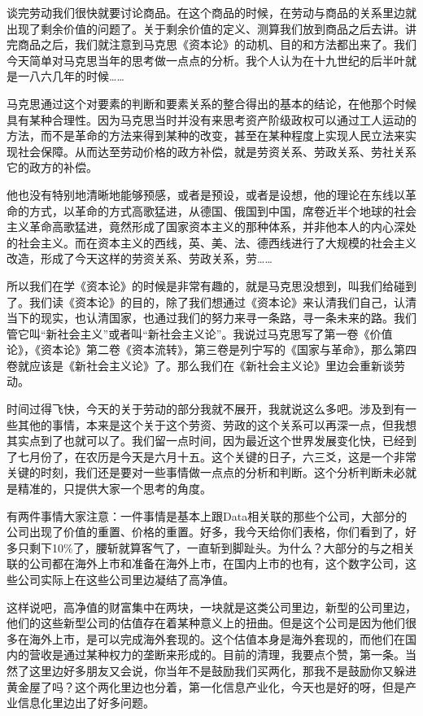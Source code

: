 \documentclass[UTF8, 12pt, a4paper]{ctexrep}
\begin{document}
谈完劳动我们很快就要讨论商品。在这个商品的时候，在劳动与商品的关系里边就出现了剩余价值的问题了。关于剩余价值的定义、测算我们放到商品之后去讲。讲完商品之后，我们就注意到马克思《资本论》的动机、目的和方法都出来了。我们今天简单对马克思当年的思考做一点点的分析。我个人认为在十九世纪的后半叶就是一八六几年的时候……

马克思通过这个对要素的判断和要素关系的整合得出的基本的结论，在他那个时候具有某种合理性。因为马克思当时并没有来思考资产阶级政权可以通过工人运动的方法，而不是革命的方法来得到某种的改变，甚至在某种程度上实现人民立法来实现社会保障。从而达至劳动价格的政方补偿，就是劳资关系、劳政关系、劳社关系它的政方的补偿。

他也没有特别地清晰地能够预感，或者是预设，或者是设想，他的理论在东线以革命的方式，以革命的方式高歌猛进，从德国、俄国到中国，席卷近半个地球的社会主义革命高歌猛进，竟然形成了国家资本主义的那种体系，并非他本人的内心深处的社会主义。而在资本主义的西线，英、美、法、德西线进行了大规模的社会主义改造，形成了今天这样的劳资关系、劳政关系，劳……

所以我们在学《资本论》的时候是非常有趣的，就是马克思没想到，叫我们给碰到了。我们读《资本论》的目的，除了我们想通过《资本论》来认清我们自己，认清当下的现实，也认清国家，也通过我们的努力来寻一条路，寻一条未来的路。我们管它叫“新社会主义”或者叫“新社会主义论”。我说过马克思写了第一卷《价值论》，《资本论》第二卷《资本流转》，第三卷是列宁写的《国家与革命》，那么第四卷就应该是《新社会主义论》了。那么我们在《新社会主义论》里边会重新谈劳动。

时间过得飞快，今天的关于劳动的部分我就不展开，我就说这么多吧。涉及到有一些其他的事情，本来是这个关于这个劳资、劳政的这个关系可以再深一点，但我想其实点到了也就可以了。我们留一点时间，因为最近这个世界发展变化快，已经到了七月份了，在农历是今天是六月十五。这个关键的日子，六三爻，这是一个非常关键的时刻，我们还是要对一些事情做一点点的分析和判断。这个分析判断未必就是精准的，只提供大家一个思考的角度。

有两件事情大家注意：一件事情是基本上跟Data相关联的那些个公司，大部分的公司出现了价值的重置、价格的重置。好多，我今天给你们表格，你们看到了，好多只剩下10\%了，腰斩就算客气了，一直斩到脚趾头。为什么？大部分的与之相关联的公司都在海外上市和准备在海外上市，在国内上市的也有，这个数字公司，这些公司实际上在这些公司里边凝结了高净值。

这样说吧，高净值的财富集中在两块，一块就是这类公司里边，新型的公司里边，他们的这些新型公司的估值存在着某种意义上的扭曲。但是这个公司是因为他们很多在海外上市，是可以完成海外套现的。这个估值本身是海外套现的，而他们在国内的营收是通过某种权力的垄断来形成的。目前的清理，我要点个赞，第一条。当然了这里边好多朋友又会说，你当年不是鼓励我们买两化，那我不是鼓励你又躲进黄金屋了吗？这个两化里边也分着，第一化信息产业化，今天也是好的呀，但是产业信息化里边出了好多问题。
\end{document}
